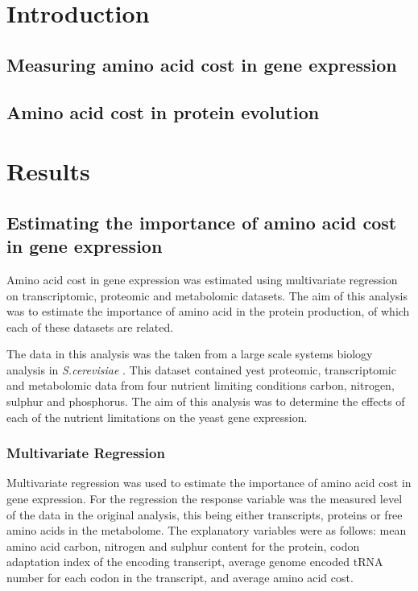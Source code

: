 \section{Introduction}

\subsection{Measuring amino acid cost in gene expression}

\subsection{Amino acid cost in protein evolution}

\section{Results}

\subsection{Estimating the importance of amino acid cost in gene expression}

Amino acid cost in gene expression was estimated using multivariate regression on transcriptomic, proteomic and metabolomic datasets. The aim of this analysis was to estimate the importance of amino acid in the protein production, of which each of these datasets are related.

The data in this analysis was the taken from a large scale systems biology analysis in \emph{S.cerevisiae} \cite{Castrillo2007}. This dataset contained yest proteomic, transcriptomic and metabolomic data from four nutrient limiting conditions carbon, nitrogen, sulphur and phosphorus. The aim of this analysis was to determine the effects of each of the nutrient limitations on the yeast gene expression.

\subsubsection{Multivariate Regression}

Multivariate regression was used to estimate the importance of amino acid cost in gene expression. For the regression the response variable was the measured level of the data in the original analysis, this being either transcripts, proteins or free amino acids in the metabolome. The explanatory variables were as follows: mean amino acid carbon, nitrogen and sulphur content for the protein, codon adaptation index of the encoding transcript, average genome encoded tRNA number for each codon in the transcript, and average amino acid cost.

